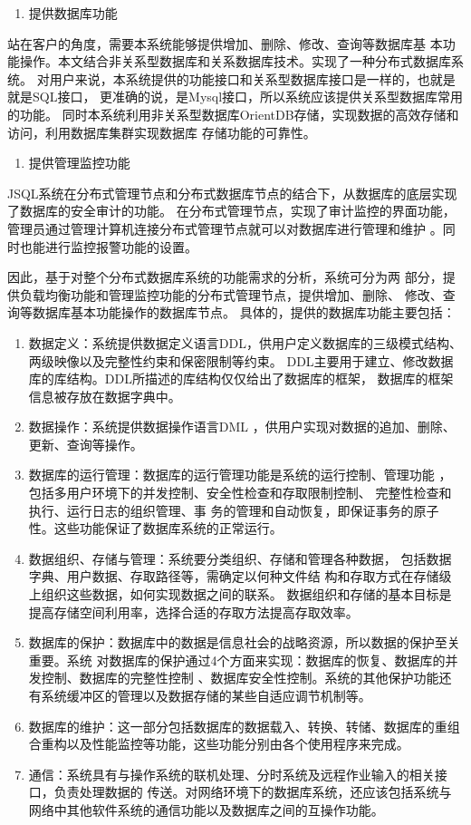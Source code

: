 	\begin{enumerate}[resume]
		\item 提供数据库功能
	\end{enumerate}

	站在客户的角度，需要本系统能够提供增加、删除、修改、查询等数据库基
	本功能操作。本文结合非关系型数据库和关系数据库技术。实现了一种分布式数据库系统。
	对用户来说，本系统提供的功能接口和关系型数据库接口是一样的，也就是就是SQL接口，
	更准确的说，是Mysql接口，所以系统应该提供关系型数据库常用的功能。
	同时本系统利用非关系型数据库OrientDB存储，实现数据的高效存储和访问，利用数据库集群实现数据库
	存储功能的可靠性。
	
	\begin{enumerate}[resume]
		\item 提供管理监控功能
	\end{enumerate}

	JSQL系统在分布式管理节点和分布式数据库节点的结合下，从数据库的底层实现了数据库的安全审计的功能。
	在分布式管理节点，实现了审计监控的界面功能，管理员通过管理计算机连接分布式管理节点就可以对数据库进行管理和维护
	。同时也能进行监控报警功能的设置。


	因此，基于对整个分布式数据库系统的功能需求的分析，系统可分为两
	部分，提供负载均衡功能和管理监控功能的分布式管理节点，提供增加、删除、
	修改、查询等数据库基本功能操作的数据库节点。
具体的，提供的数据库功能主要包括：
\begin{enumerate}[fullwidth,itemindent=2em,listparindent=2em]
	\item 数据定义：系统提供数据定义语言DDL，供用户定义数据库的三级模式结构、两级映像以及完整性约束和保密限制等约束。
	DDL主要用于建立、修改数据库的库结构。DDL所描述的库结构仅仅给出了数据库的框架，
	数据库的框架信息被存放在数据字典中。
	\item 数据操作：系统提供数据操作语言DML
	，供用户实现对数据的追加、删除、更新、查询等操作。
	\item 数据库的运行管理：数据库的运行管理功能是系统的运行控制、管理功能
	，包括多用户环境下的并发控制、安全性检查和存取限制控制、
	完整性检查和执行、运行日志的组织管理、事
	务的管理和自动恢复，即保证事务的原子性。这些功能保证了数据库系统的正常运行。
	\item 数据组织、存储与管理：系统要分类组织、存储和管理各种数据，
	包括数据字典、用户数据、存取路径等，需确定以何种文件结
	构和存取方式在存储级上组织这些数据，如何实现数据之间的联系。
	数据组织和存储的基本目标是提高存储空间利用率，选择合适的存取方法提高存取效率。
	\item   数据库的保护：数据库中的数据是信息社会的战略资源，所以数据的保护至关重要。系统
	对数据库的保护通过4个方面来实现：数据库的恢复、数据库的并发控制、数据库的完整性控制
	、数据库安全性控制。系统的其他保护功能还有系统缓冲区的管理以及数据存储的某些自适应调节机制等。
	\item  数据库的维护：这一部分包括数据库的数据载入、转换、转储、数据库的重组合重构以及性能监控等功能，这些功能分别由各个使用程序来完成。
	\item 通信：系统具有与操作系统的联机处理、分时系统及远程作业输入的相关接口，负责处理数据的
	传送。对网络环境下的数据库系统，还应该包括系统与网络中其他软件系统的通信功能以及数据库之间的互操作功能。
\end{enumerate}
